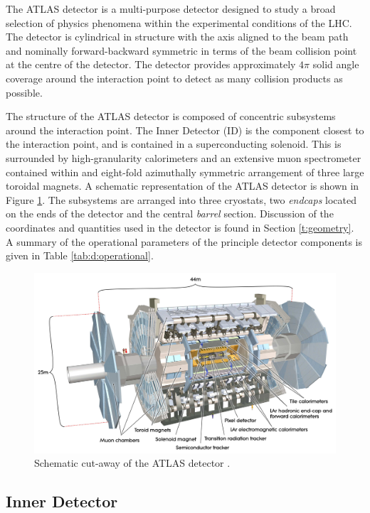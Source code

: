 	The ATLAS detector \cite{ATLAS} is a multi-purpose detector designed to study a broad selection of physics phenomena within the experimental conditions of the LHC. The detector is cylindrical in structure with the axis aligned to the beam path and nominally forward-backward symmetric in terms of the beam collision point at the centre of the detector. The detector provides approximately $4\pi$ solid angle coverage around the interaction point to detect as many collision products as possible.

	The structure of the ATLAS detector is composed of concentric subsystems around the interaction point.  The Inner Detector (ID) is the component closest to the interaction point, and is contained in a superconducting solenoid. This is surrounded by high-granularity calorimeters and an extensive muon spectrometer contained within and eight-fold azimuthally symmetric arrangement of three large toroidal magnets. A schematic representation of the ATLAS detector is shown in Figure \ref{fig:t:ATLAS}. 	The subsystems are arranged into three cryostats, two \textit{endcaps} located on the ends of the detector and the central \textit{barrel} section. Discussion of the coordinates and quantities used in the detector is found in Section \ref{t:geometry}. A summary of the operational parameters of the principle detector components is given in Table \ref{tab:d:operational}.

	\begin{figure}[h]
		\centering
		\includegraphics[width=0.7\linewidth]{D/FIGS/ATLAS_SE_Corrected7}
		\caption{Schematic cut-away of the ATLAS detector \cite{ATLASSchem}.}
		\label{fig:t:ATLAS}
	\end{figure}



	\subsection{Inner Detector}
	\label{d:id}

